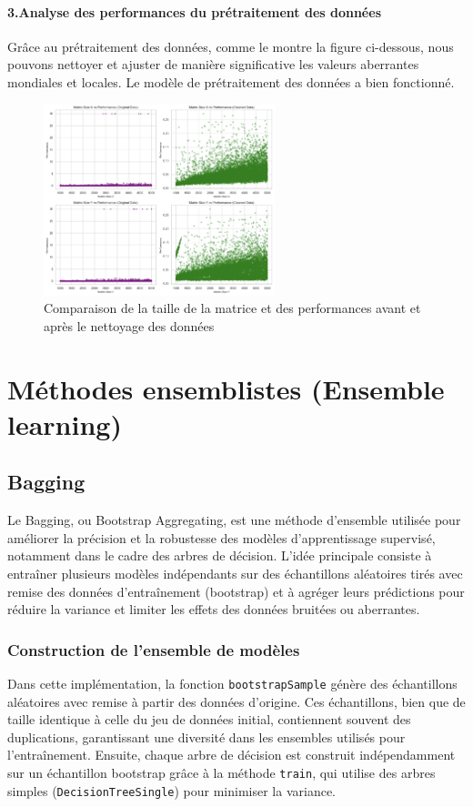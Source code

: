 \documentclass{rapportECL2024}
\newcommand{\var}[1]{\texttt{#1}}
\newcommand{\func}[1]{\small\texttt{#1}}
\begin{document}
\paragraph{3.Analyse des performances du prétraitement des données}
Grâce au prétraitement des données, comme le montre la figure ci-dessous, nous pouvons nettoyer et ajuster de manière significative les valeurs aberrantes mondiales et locales. Le modèle de prétraitement des données a bien fonctionné.
\begin{figure}[h!] 
    \centering
    \includegraphics[width=0.6\textwidth]{logos/data_clean.jpg} 
    \caption{Comparaison de la taille de la matrice et des performances avant et après le nettoyage des données} 
    \label{fig:data_clean}
\end{figure}









\section{Méthodes ensemblistes (Ensemble learning)}

\subsection{Bagging}
Le Bagging, ou Bootstrap Aggregating, est une méthode d’ensemble utilisée pour améliorer la précision et la robustesse des modèles d’apprentissage supervisé, notamment dans le cadre des arbres de décision. L’idée principale consiste à entraîner plusieurs modèles indépendants sur des échantillons aléatoires tirés avec remise des données d’entraînement (bootstrap) et à agréger leurs prédictions pour réduire la variance et limiter les effets des données bruitées ou aberrantes. 
\subsubsection{Construction de l'ensemble de modèles}
Dans cette implémentation, la fonction \func{bootstrapSample} génère des échantillons aléatoires avec remise à partir des données d'origine. Ces échantillons, bien que de taille identique à celle du jeu de données initial, contiennent souvent des duplications, garantissant une diversité dans les ensembles utilisés pour l’entraînement. Ensuite, chaque arbre de décision est construit indépendamment sur un échantillon bootstrap grâce à la méthode \func{train}, qui utilise des arbres simples (\var{DecisionTreeSingle}) pour minimiser la variance.
\end{document}
